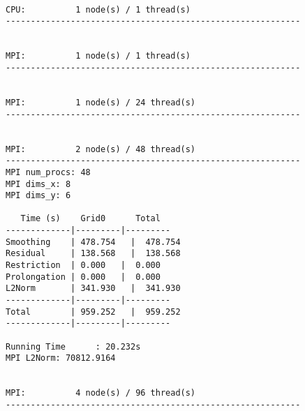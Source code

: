 \begin{lstlisting}[basicstyle=\tiny, frame=single, caption={Task 2: Collected Euler outputs.}, label={lst:1}]

CPU:          1 node(s) / 1 thread(s)
-----------------------------------------------------------


MPI:          1 node(s) / 1 thread(s)
-----------------------------------------------------------


MPI:          1 node(s) / 24 thread(s)
-----------------------------------------------------------


MPI:          2 node(s) / 48 thread(s)
-----------------------------------------------------------
MPI num_procs: 48
MPI dims_x: 8
MPI dims_y: 6

   Time (s)    Grid0      Total  
-------------|---------|---------
Smoothing    | 478.754   |  478.754  
Residual     | 138.568   |  138.568  
Restriction  | 0.000   |  0.000  
Prolongation | 0.000   |  0.000  
L2Norm       | 341.930   |  341.930  
-------------|---------|---------
Total        | 959.252   |  959.252  
-------------|---------|---------

Running Time      : 20.232s
MPI L2Norm: 70812.9164


MPI:          4 node(s) / 96 thread(s)
-----------------------------------------------------------




\end{lstlisting}